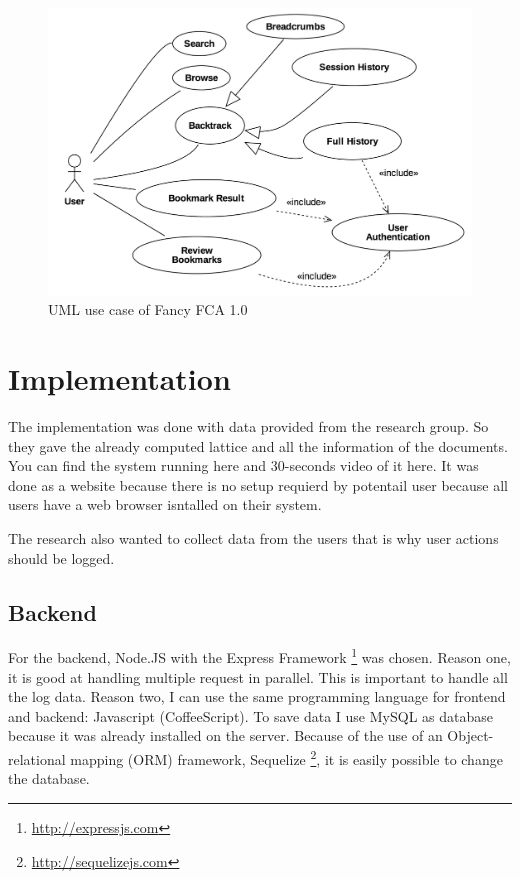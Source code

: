 \documentclass[11pt]{report}
\begin{document}
\begin{figure}[!ht]
	\centering
	\includegraphics[width=\linewidth]{images/usecase}
\caption{UML use case of Fancy FCA 1.0}
\label{figure:usecase}
\end{figure}

\section{Implementation}

The implementation was done with data provided from the research group. So they gave the already computed lattice and all the information of the documents. You can find the system running here and 30-seconds video of it here. It was done as a website because there is no setup requierd by potentail user because all users have a web browser isntalled on their system.

The research also wanted to collect data from the users that is why user actions should be logged.


\subsection{Backend}

For the backend, Node.JS with the Express Framework \footnote{\url{http://expressjs.com}} was chosen. Reason one, it is good at handling multiple request in parallel. This is important to handle all the log data. Reason two, I can use the same programming language for frontend and backend: Javascript (CoffeeScript). To save data I use MySQL as database because it was already installed on the server. Because of the use of an Object-relational mapping (ORM) framework, Sequelize \footnote{\url{http://sequelizejs.com}}, it is easily possible to change the database.
\end{document}
